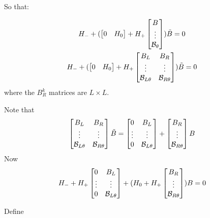 \documentclass{elsart}
\begin{document}
\begin{prf}
So that:

\begin{gather}
  H_{-} + 
 (  \begin{bmatrix}
    0&H_0
  \end{bmatrix} + H_+ 
  \begin{bmatrix}
    B\\\vdots\\ \mathcal{B}_{\theta}
  \end{bmatrix})\tilde{B} = 0\\
  H_{-} + 
 (  \begin{bmatrix}
    0&H_0
  \end{bmatrix} + H_+ 
  \begin{bmatrix}
    B_L&B_R\\\vdots&\vdots\\ \mathcal{B}_{L\theta}&\mathcal{B}_{R\theta}
  \end{bmatrix})\tilde{B} = 0
\end{gather}
where the $B_R^k$ matrices are $L \times{} L$.

Note that
\begin{gather}
    \begin{bmatrix}
    B_L&B_R\\\vdots&\vdots\\ \mathcal{B}_{L\theta}&\mathcal{B}_{R\theta}
  \end{bmatrix}\tilde{B} = 
  \begin{bmatrix}
    0&B_L\\\vdots&\vdots\\0&\mathcal{B}_{L\theta}
  \end{bmatrix}+
  \begin{bmatrix}
    B_R\\\vdots\\\mathcal{B}_{R\theta}
  \end{bmatrix}B
\end{gather}
Now
\begin{gather}
  H_- + H_+  \begin{bmatrix}
    0&B_L\\\vdots&\vdots\\0&\mathcal{B}_{L\theta}
  \end{bmatrix}    +  (H_0 + H_+  \begin{bmatrix}
    B_R\\\vdots\\\mathcal{B}_{R\theta}
  \end{bmatrix})B=0
\end{gather}

Define


\end{prf}
\end{document}
